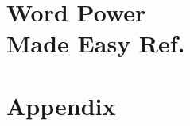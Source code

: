 \documentclass[10pt,a4paper,twoside]{article} %
\begin{document}
\thispagestyle{empty}

\section*{ \vspace*{10\baselineskip}
	    \LARGE \textbf{Word Power \\ Made Easy Ref.} \\
		}


\setlength{\parindent}{0in}





\newpage

\section*{ 	\vspace*{2\baselineskip}
		\LARGE \textbf{Appendix} \\
		\normalsize  \vspace*{\baselineskip}}





\end{document}
